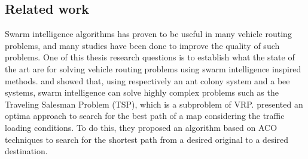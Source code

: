 \subsection{Related work}


Swarm intelligence algorithms has proven to be useful in many vehicle routing problems, and many studies have been done to improve the quality of such problems. One of this thesis research questions is to establish what the state of the art are for solving vehicle routing problems using swarm intelligence inspired methods. \citet{dorigo97} and \citet{lucic03} showed that, using respectively an ant colony system and a bee systems, swarm intelligence can solve highly complex problems such as the Traveling Salesman Problem (TSP), which is a subproblem of VRP. \citet{hsiao04} presented an optima approach to search for the best path of a map considering the traffic loading conditions. To do this, they proposed an algorithm based on ACO techniques to search for the shortest path from a desired original to a desired destination. %

